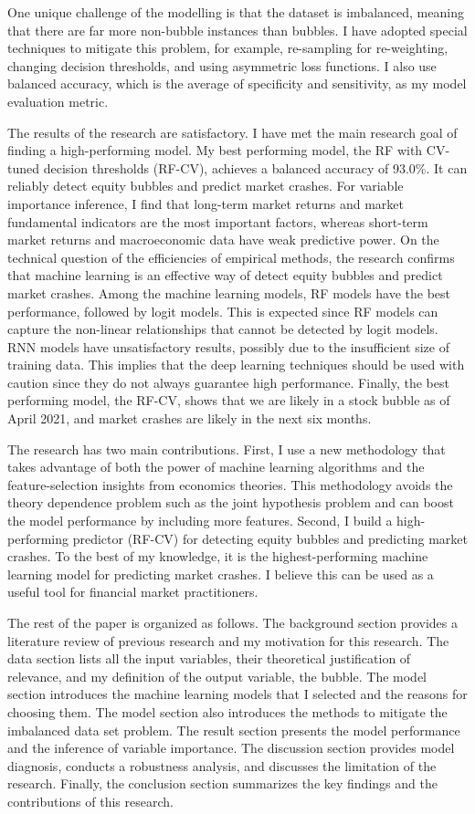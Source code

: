 \documentclass[12pt, man, a4paper, floatsintext]{apa7}
\begin{document}
One unique challenge of the modelling is that the dataset is imbalanced, meaning that there are far more non-bubble instances than bubbles. I have adopted special techniques to mitigate this problem, for example, re-sampling for re-weighting, changing decision thresholds, and using asymmetric loss functions. I also use balanced accuracy, which is the average of specificity and sensitivity, as my model evaluation metric.

The results of the research are satisfactory. I have met the main research goal of finding a high-performing model. My best performing model, the RF with CV-tuned decision thresholds (RF-CV), achieves a balanced accuracy of 93.0\%. It can reliably detect equity bubbles and predict market crashes. For variable importance inference, I find that long-term market returns and market fundamental indicators are the most important factors, whereas short-term market returns and macroeconomic data have weak predictive power. On the technical question of the efficiencies of empirical methods, the research confirms that machine learning is an effective way of detect equity bubbles and predict market crashes. Among the machine learning models, RF models have the best performance, followed by logit models. This is expected since RF models can capture the non-linear relationships that cannot be detected by logit models. RNN models have unsatisfactory results, possibly due to the insufficient size of training data. This implies that the deep learning techniques should be used with caution since they do not always guarantee high performance. Finally, the best performing model, the RF-CV, shows that we are likely in a stock bubble as of April 2021, and market crashes are likely in the next six months.

The research has two main contributions. First, I use a new methodology that takes advantage of both the power of machine learning algorithms and the feature-selection insights from economics theories. This methodology avoids the theory dependence problem such as the joint hypothesis problem and can boost the model performance by including more features. Second, I build a high-performing predictor (RF-CV) for detecting equity bubbles and predicting market crashes. To the best of my knowledge, it is the highest-performing machine learning model for predicting market crashes. I believe this can be used as a useful tool for financial market practitioners.


The rest of the paper is organized as follows. The background section provides a literature review of previous research and my motivation for this research. The data section lists all the input variables, their theoretical justification of relevance, and my definition of the output variable, the bubble. The model section introduces the machine learning models that I selected and the reasons for choosing them. The model section also introduces the methods to mitigate the imbalanced data set problem. The result section presents the model performance and the inference of variable importance. The discussion section provides model diagnosis, conducts a robustness analysis, and discusses the limitation of the research. Finally, the conclusion section summarizes the key findings and the contributions of this research.
\end{document}
